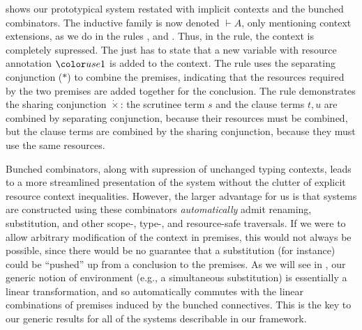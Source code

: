  shows our prototypical system restated with
implicit contexts and the bunched combinators. The inductive family is
now denoted $\vdash A$, only mentioning context extensions, as we do
in the rules ,
 and . Thus,
in the  rule, the context is completely
supressed. The  just has to state that a
new variable with resource annotation $\gr1$ is added to the
context. The  rule uses the separating
conjunction ($*$) to combine the premises, indicating that the
resources required by the two premises are added together for the
conclusion. The  rule demonstrates the
sharing conjunction $\dot\times$: the scrutinee term $s$ and the
clause terms $t, u$ are combined by separating conjunction, because
their resources must be combined, but the clause terms are combined by
the sharing conjunction, because they must use the same resources.

Bunched combinators, along with supression of unchanged typing
contexts, leads to a more streamlined presentation of the system
without the clutter of explicit resource context
inequalities. However, the larger advantage for us is that systems are
constructed using these combinators \emph{automatically} admit
renaming, substitution, and other scope-, type-, and resource-safe
traversals. If we were to allow arbitrary modification of the context
in premises, this would not always be possible, since there would be
no guarantee that a substitution (for instance) could be ``pushed'' up
from a conclusion to the premises. As we will see in ,
our generic notion of environment (e.g., a simultaneous substitution)
is essentially a linear transformation, and so automatically commutes
with the linear combinations of premises induced by the bunched
connectives. This is the key to our generic results for all of the
systems describable in our framework.
